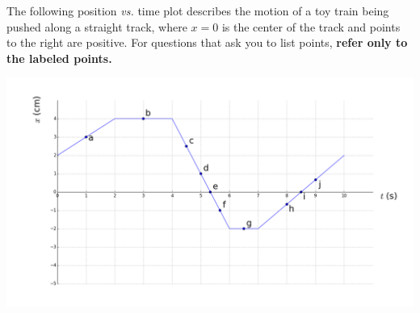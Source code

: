 \documentclass[12pt]{exam}
\begin{document}
\begin{questions}

\clearpage
\question
The following position \textit{vs.} time plot describes the motion of a toy train being pushed along a straight track, where $x=0$ is the center of the track and points to the right are positive. For questions that ask you to list points, \textbf{refer only to the labeled points.}

\begin{center}
\includegraphics[width=\textwidth]{../images/test1_plot.png}
\end{center}

\end{questions}
\end{document}
